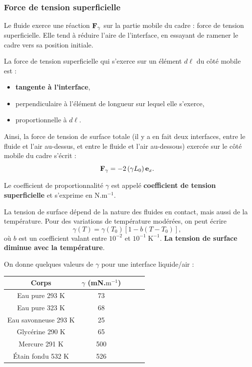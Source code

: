 \documentclass[11pt,a4paper]{report}
\begin{document}
	\subsubsection{Force de tension superficielle}	
	
Le fluide exerce une réaction $\bold{F}_\gamma$ sur la partie mobile du cadre : force de tension superficielle. Elle tend à réduire l'aire de l'interface, en essayant de ramener le cadre vers sa position initiale.
	
La force de tension superficielle qui s'exerce sur un élément $d\ell$ du côté mobile est :
\begin{itemize}
	\item \textbf{tangente à l'interface},
	\item perpendiculaire à l'élément de longueur sur lequel elle s'exerce,
	\item proportionnelle à $d\ell$.
\end{itemize}

Ainsi, la force de tension de surface totale (il y a en fait deux interfaces, entre le fluide et l'air au-dessus, et entre le fluide et l'air au-dessous) exercée sur le côté mobile du cadre s'écrit :
\begin{equation}
	\bold{F}_\gamma = - 2 \left(\gamma L_0\right) \bold{e}_x.
\end{equation}

Le coefficient de proportionnalité $\gamma$ est appelé \textbf{coefficient de tension superficielle} et s'exprime en $\text{N}.\text{m}^{-1}$.

La tension de surface dépend de la nature des fluides en contact, mais aussi de la température. Pour des variations de température modérées, on peut écrire
\begin{equation}
	\gamma(T) = \gamma(T_0)\left[1 - b(T-T_0)\right],
\end{equation}
où $b$ est un coefficient valant entre $10^{-2}$ et $10^{-1}\;\text{K}^{-1}$. \textbf{La tension de surface diminue avec la température}.

On donne quelques valeurs de $\gamma$ pour une interface liquide/air :
\begin{center}
\begin{tabular}{|c|c|c|c|c|}
  \hline
  	Corps & $\gamma$ (mN.$\text{m}^{-1}$) \\
  \hline
  \hline
  	Eau pure 293 K & 73 \\
  \hline
  	Eau pure 323 K & 68 \\
  \hline
	Eau savonneuse 293 K & 25 \\
  \hline
  	Glycérine 290 K & 65 \\
  \hline
  	Mercure 291 K  & 500\\
  \hline
  	\'Etain fondu 532 K  & 526\\
  \hline
\end{tabular}
\end{center}
\end{document}
